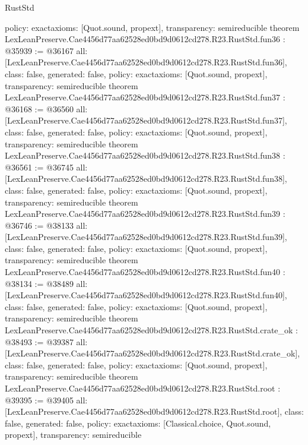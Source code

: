 \begin{lexlean}{RustStd}
\begin{coremodule}
{  policy: exact{axioms: [Quot.sound, propext]},
  transparency: semireducible
}
theorem LexLeanPreserve.Cae4456d77aa62528ed0bd9d0612cd278.R23.RustStd.fun36 : @35939 := @36167 {
  all: [LexLeanPreserve.Cae4456d77aa62528ed0bd9d0612cd278.R23.RustStd.fun36],
  class: false,
  generated: false,
  policy: exact{axioms: [Quot.sound, propext]},
  transparency: semireducible
}
theorem LexLeanPreserve.Cae4456d77aa62528ed0bd9d0612cd278.R23.RustStd.fun37 : @36168 := @36560 {
  all: [LexLeanPreserve.Cae4456d77aa62528ed0bd9d0612cd278.R23.RustStd.fun37],
  class: false,
  generated: false,
  policy: exact{axioms: [Quot.sound, propext]},
  transparency: semireducible
}
theorem LexLeanPreserve.Cae4456d77aa62528ed0bd9d0612cd278.R23.RustStd.fun38 : @36561 := @36745 {
  all: [LexLeanPreserve.Cae4456d77aa62528ed0bd9d0612cd278.R23.RustStd.fun38],
  class: false,
  generated: false,
  policy: exact{axioms: [Quot.sound, propext]},
  transparency: semireducible
}
theorem LexLeanPreserve.Cae4456d77aa62528ed0bd9d0612cd278.R23.RustStd.fun39 : @36746 := @38133 {
  all: [LexLeanPreserve.Cae4456d77aa62528ed0bd9d0612cd278.R23.RustStd.fun39],
  class: false,
  generated: false,
  policy: exact{axioms: [Quot.sound, propext]},
  transparency: semireducible
}
theorem LexLeanPreserve.Cae4456d77aa62528ed0bd9d0612cd278.R23.RustStd.fun40 : @38134 := @38489 {
  all: [LexLeanPreserve.Cae4456d77aa62528ed0bd9d0612cd278.R23.RustStd.fun40],
  class: false,
  generated: false,
  policy: exact{axioms: [Quot.sound, propext]},
  transparency: semireducible
}
theorem LexLeanPreserve.Cae4456d77aa62528ed0bd9d0612cd278.R23.RustStd.crate_ok : @38493 := @39387 {
  all: [LexLeanPreserve.Cae4456d77aa62528ed0bd9d0612cd278.R23.RustStd.crate_ok],
  class: false,
  generated: false,
  policy: exact{axioms: [Quot.sound, propext]},
  transparency: semireducible
}
theorem LexLeanPreserve.Cae4456d77aa62528ed0bd9d0612cd278.R23.RustStd.root : @39395 := @39405 {
  all: [LexLeanPreserve.Cae4456d77aa62528ed0bd9d0612cd278.R23.RustStd.root],
  class: false,
  generated: false,
  policy: exact{axioms: [Classical.choice, Quot.sound, propext]},
  transparency: semireducible
}


\end{coremodule}
\end{lexlean}
